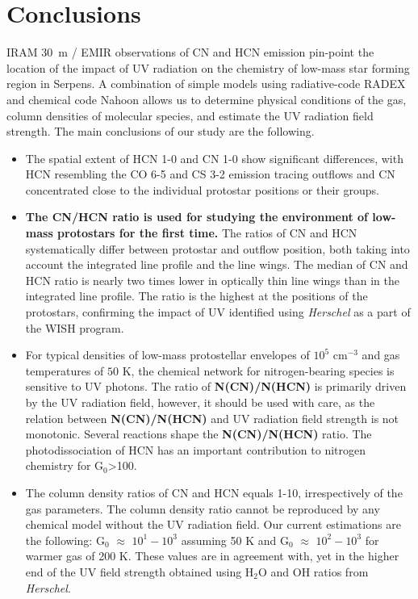 \documentclass{aa}
\begin{document}
\section{Conclusions}
\label{section:conclusions}

IRAM 30~m / EMIR observations of CN and HCN emission pin-point the location 
of the impact of UV radiation on the chemistry of low-mass star forming region in Serpens. 
A combination of simple models using radiative-code RADEX and chemical code Nahoon 
allows us to determine physical conditions of the gas, column densities of molecular species,
and estimate the UV radiation field strength. The main conclusions of our study are the 
following. 
\begin{itemize} 
\item The spatial extent of HCN 1-0 and CN 1-0 show significant differences, with 
HCN resembling the CO 6-5 and CS 3-2 emission tracing outflows and CN concentrated close to the individual protostar positions or their groups.
\item \textbf{The CN/HCN ratio is used for studying the environment of low-mass protostars for the first time.} The ratios of CN and HCN systematically differ between protostar and outflow position,
both taking into account the integrated line profile and the line wings. The median of CN and HCN ratio is nearly two times lower in optically thin line wings than in the integrated line profile. The ratio 
is the highest at the positions of the protostars, confirming the impact of UV identified 
using \textit{Herschel} as a part of the WISH program. 
\item For typical densities of low-mass protostellar envelopes of $10^5$ cm$^{-3}$ and 
gas temperatures of $50$ K, the chemical network for nitrogen-bearing species is sensitive to UV photons. The ratio of \textbf{N(CN)/N(HCN)} is primarily driven by the UV radiation field, however, it should be used with care, as the relation between \textbf{N(CN)/N(HCN)} and UV radiation field strength is not monotonic. Several reactions shape the \textbf{N(CN)/N(HCN)} ratio. The photodissociation of HCN has an important contribution to nitrogen chemistry for G$_0$>100.
\item The column density ratios of CN and HCN equals 1-10, irrespectively of the gas parameters. The column density ratio cannot be reproduced by any chemical model without the UV radiation field. Our current estimations are the following: G$_0$ $\approx$ $10^{1}-10^{3}$ assuming 50 K and G$_0$ $\approx$ $10^{2}-10^{3}$ for warmer gas of 200 K.
These values are in agreement with, yet in the higher end of the UV field strength obtained using 
H$_2$O and OH ratios from \textit{Herschel}.
\end{itemize}
\end{document}
